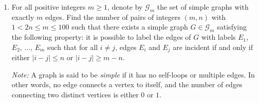 \documentclass[10pt]{article}
\begin{document}
\begin{enumerate}

\item For all positive integers $m\geq 1$, denote by $\mathcal{G}_m$ the set of simple graphs with exactly $m$ edges.  Find the number of pairs of integers $(m,n)$ with $1<2n\leq m\leq 100$ such that there exists a simple graph $G\in\mathcal{G}_m$ satisfying the following property: it is possible to label the edges of $G$ with labels $E_1$, $E_2$, $\ldots$, $E_m$ such that for all $i\neq j$, edges $E_i$ and $E_j$ are incident if and only if either $|i-j|\leq n$ or $|i-j|\geq m-n$.

\par \textit{Note: }A graph is said to be \textit{simple} if it has no self-loops or multiple edges. In other words, no edge connects a vertex to itself, and the number of edges connecting two distinct vertices is either $0$ or $1$.

\end{enumerate}
\end{document}
